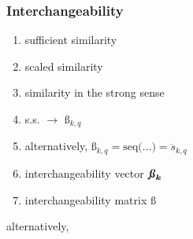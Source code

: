 \documentclass{elsarticle} %
\begin{document}
\subsubsection{Interchangeability}
\begin{enumerate}
    \item sufficient similarity
    \item scaled similarity
    \item similarity in the strong sense
    \item s.s. $\rightarrow$ $\textit{\ss}_{k,q}$
    \item alternatively, $\textit{\ss}_{k,q} = \text{seq(...)} = \ddot{s}_{k,q}$
    \item interchangeability vector $\boldsymbol{\textbf{\textit{\ss}}_k}$
    \item interchangeability matrix $\boldsymbol{\textbf{\ss}}$
\end{enumerate}
alternatively,
\end{document}
